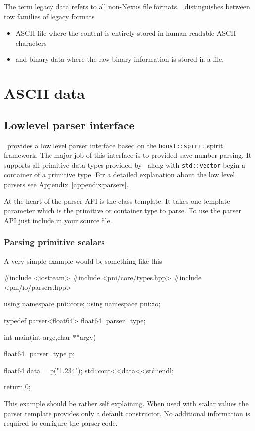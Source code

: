
The term legacy data refers to all non-Nexus file formats.
\libpnicore\ distinguishes between tow families of legacy formats 
\begin{itemize}
\item ASCII file where the content is entirely stored in human readable ASCII
characters
\item and binary data where the raw binary information is stored in a file.
\end{itemize}

\section{ASCII data}

\subsection{Lowlevel parser interface}

\libpniio\ provides a low level parser interface based on the \texttt{boost::spirit}
spirit framework. The major job of this interface is to provided save number
parsing. It supports all primitive data types provided by \libpnicore\ along
with \texttt{std::vector} begin a container of a primitive type.
For a detailed explanation about the low level parsers see
Appendix~\ref{appendix:parsers}. 

At the heart of the parser API is the  class template. 
It takes one template parameter which is the primitive or container type 
to parse. To use the parser API just include  in 
your source file. 

\subsubsection{Parsing primitive scalars}

A very simple example would be something like this
\begin{cppcode}
#include <iostream>
#include <pni/core/types.hpp>
#include <pni/io/parsers.hpp>

using namespace pni::core;
using namespace pni::io;

typedef parser<float64> float64_parser_type;

int main(int argc,char **argv)
{
    float64_parser_type p;

    float64 data = p("1.234");
    std::cout<<data<<std::endl;

    return 0;
}
\end{cppcode}
This example should be rather self explaining. 
When used with scalar values the parser template provides only a default 
constructor. No additional information is required to configure the 
parser code. 

